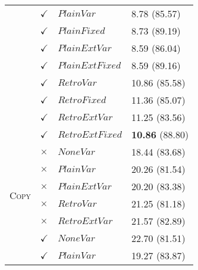 \documentclass[11pt,letterpaper]{article}
\begin{document}
\begin{table}
\begin{tabular}{|l|l|l|l| }
 & $\checkmark$ & $PlainVar$ &  8.78 (85.57) \\
 & $\checkmark$ & $PlainFixed$ &  8.73 (89.19)\\
 & $\checkmark$ & $PlainExtVar$  & 8.59 (86.04) \\
 & $\checkmark$ & $PlainExtFixed$  & 8.59 (89.16) \\
 & $\checkmark$ & $RetroVar$ &  10.86 (85.58) \\
 & $\checkmark$ & $RetroFixed$ &  11.36 (85.07) \\
 & $\checkmark$ & $RetroExtVar$  & 11.25 (83.56) \\
 & $\checkmark$ & $RetroExtFixed$  & \textbf{10.86} (88.80) \\  \hline
\multirow{6}{*}{\textsc{Copy}} & $\times$ & $NoneVar$ & 18.44 (83.68) \\
 & $\times$ & $PlainVar$ & 20.26 (81.54) \\ %
 & $\times$ & $PlainExtVar$  & 20.20 (83.38)\\ 
 & $\times$ & $RetroVar$ &  21.25 (81.18) \\
 & $\times$ & $RetroExtVar$  & 21.57 (82.89) \\
  & $\checkmark$ & $NoneVar$ &  22.70 (81.51) \\
 & $\checkmark$ & $PlainVar$ &  19.27 (83.87) \\ 

\end{tabular}
\end{table}
\end{document}
